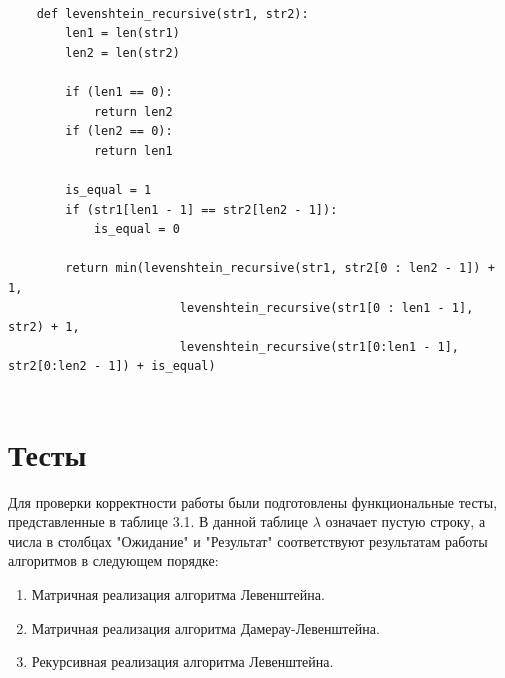 \documentclass[12pt, a4paper]{report}
\begin{document}
	\begin{lstlisting}[label=some-code,caption=Рекурсивная реализация алгоритма Левенштейна]
	
	def levenshtein_recursive(str1, str2):
		len1 = len(str1)
		len2 = len(str2)
		
		if (len1 == 0):
			return len2
		if (len2 == 0):
			return len1
		
		is_equal = 1
		if (str1[len1 - 1] == str2[len2 - 1]):
			is_equal = 0
		
		return min(levenshtein_recursive(str1, str2[0 : len2 - 1]) + 1,
						levenshtein_recursive(str1[0 : len1 - 1], str2) + 1,
						levenshtein_recursive(str1[0:len1 - 1], str2[0:len2 - 1]) + is_equal)
	
	\end{lstlisting}

	\newpage

	\section{Тесты}
	Для проверки корректности работы были подготовлены функциональные тесты, представленные в таблице 3.1. В данной таблице $\lambda$ означает пустую строку, а числа в столбцах "Ожидание" и "Результат" соответствуют результатам работы алгоритмов в следующем порядке:
	\begin{enumerate}
		\item Матричная реализация алгоритма Левенштейна.
		\item Матричная реализация алгоритма Дамерау-Левенштейна.
		\item Рекурсивная реализация алгоритма Левенштейна.
	\end{enumerate}
\end{document}
